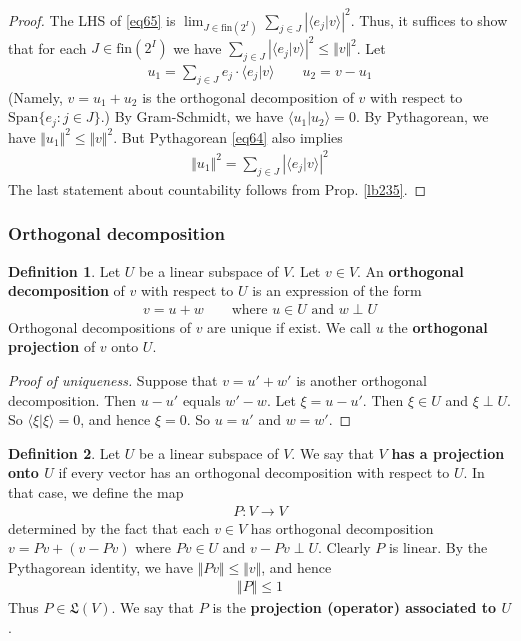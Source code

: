 \documentclass[12pt,b5paper,notitlepage]{article}
\theoremstyle{definition}
\newtheorem{df}{Definition}[subsection]
\theoremstyle{plain}
\newcommand{\fk}{\mathfrak}
\newcommand{\Span}{\mathrm{Span}}
\newcommand{\bk}[1]{\langle {#1}\rangle}
\newcommand{\fin}{\mathrm{fin}}
\numberwithin{equation}{section}
\begin{document}
\begin{proof}
The LHS of \eqref{eq65} is $\lim_{J\in\fin(2^I)}\sum_{j\in J}|\bk{e_j|v}|^2$. Thus, it suffices to show that for each $J\in\fin(2^I)$ we have $\sum_{j\in J}|\bk{e_j|v}|^2\leq \Vert v\Vert^2$. Let 
\begin{align*}
u_1=\sum_{j\in J}e_j\cdot\bk{e_j|v} \qquad u_2=v-u_1
\end{align*}
(Namely, $v=u_1+u_2$ is the orthogonal decomposition of $v$ with respect to $\Span\{e_j:j\in J\}$.) By Gram-Schmidt, we have $\bk{u_1|u_2}=0$. By Pythagorean, we have $\Vert u_1\Vert^2\leq\Vert v\Vert^2$. But Pythagorean \eqref{eq64} also implies
\begin{align*}
\Vert u_1\Vert^2=\sum_{j\in J}|\bk{e_j|v}|^2
\end{align*}
The last statement about countability follows from Prop. \ref{lb235}.
\end{proof}



\subsubsection{Orthogonal decomposition}


\begin{df}\label{lb119}
Let $U$ be a linear subspace of $V$. Let $v\in V$. An \textbf{orthogonal decomposition}  of $v$ with respect to $U$ is an expression of the form
\begin{align*}
v=u+w\qquad \text{where $u\in U$ and $w\perp U$}
\end{align*}
Orthogonal decompositions of $v$ are unique if exist. We call $u$ the \textbf{orthogonal projection} of $v$ onto $U$.
\end{df}

\begin{proof}[Proof of uniqueness]
Suppose that $v=u'+w'$ is another orthogonal decomposition. Then $u-u'$ equals $w'-w$. Let $\xi=u-u'$. Then $\xi\in U$ and $\xi\perp U$. So $\bk{\xi|\xi}=0$, and hence $\xi=0$. So $u=u'$ and $w=w'$.
\end{proof}


\begin{df}\label{lb246}
Let $U$ be a linear subspace of $V$. We say that $V$ \textbf{has a projection onto $U$}  if every vector has an orthogonal decomposition with respect to $U$. In that case, we define the map
\begin{align*}
P:V\rightarrow V
\end{align*}
determined by the fact that each $v\in V$ has orthogonal decomposition $v=Pv+(v-Pv)$ where $Pv\in U$ and $v-Pv\perp U$. Clearly $P$ is linear. By the Pythagorean identity, we have $\Vert Pv\Vert\leq\Vert v\Vert$, and hence 
\begin{align*}
\Vert P\Vert\leq 1
\end{align*} 
Thus $P\in\fk L(V)$. We say that $P$ is the \textbf{projection (operator) associated to $U$}. 
\end{df}
\end{document}
